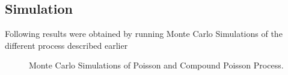 \documentclass[paper.tex]{subfiles}
\begin{document}
    \subsection{Simulation}
    Following results were obtained by running Monte Carlo Simulations of the different process described earlier
    \begin{figure}[ht!]
        \centering
        \qquad
        \caption{Monte Carlo Simulations of Poisson and Compound Poisson Process.}
        \label{fig: monte-carlo-simulations-1}
    \end{figure}
\end{document}
